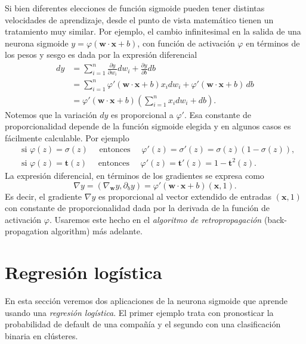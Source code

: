\documentclass[12pt, a4paper]{amsbook}
\newcommand{\tb}{{\mathbf t}}
\newcommand{\ww}{{\mathbf w}}
\newcommand{\xx}{{\mathbf x}}
\theoremstyle{remark}
\theoremstyle{definition}
\numberwithin{section}{chapter}
\numberwithin{subsection}{section}
\numberwithin{equation}{section}
\numberwithin{figure}{chapter}
\begin{document}
Si bien diferentes elecciones de función sigmoide pueden tener distintas velocidades de aprendizaje, desde el punto de vista matemático tienen un tratamiento muy similar. Por ejemplo, el cambio infinitesimal en la salida de una neurona sigmoide $y=\varphi(\ww\cdot\xx + b)$, con función de activación $\varphi$ en términos de los pesos y sesgo es dada por la expresión diferencial
\begin{align*}
dy &= \sum_{i=1}^n \frac{\partial y}{\partial w_i} dw_i + \frac{\partial y}{\partial b} db\\
&= \sum_{i=1}^n \varphi'(\ww\cdot\xx+ b) x_i dw_i + \varphi'(\ww\cdot\xx+ b) \, db\\
&=\varphi'(\ww\cdot\xx+ b)\left(\sum_{i=1}^n x_i dw_i + db\right).
\end{align*}
Notemos que la variación $dy$ es proporcional a $\varphi'$. Esa constante de proporcionalidad depende de la función sigmoide elegida y en algunos casos es fácilmente calculable. Por ejemplo
\begin{align*}
&\text{si }\varphi(z) = \sigma(z) \quad \text{ entonces } \quad \varphi'(z) = \sigma'(z) = \sigma(z)(1-\sigma(z)),\\
&\text{si }\varphi(z) = \tb(z) \quad \text{ entonces } \quad \varphi'(z) = \tb'(z) = 1-\tb^2(z).
\end{align*}
La expresión diferencial, en términos de los gradientes se expresa como
$$
\nabla y = (\nabla_\ww y, \partial_b y) = \varphi'(\ww\cdot\xx + b) (\xx, 1).
$$
Es decir, el gradiente $\nabla y$ es proporcional al vector extendido de entradas $(\xx, 1)$ con constante de proporcionalidad dada por la derivada de la función de activación $\varphi$. Usaremos este hecho en el {\em algoritmo de retropropagación} (back-propagation algorithm) más adelante.

\section{Regresión logística}\label{sec.c5.4}

En esta sección veremos dos aplicaciones de la neurona sigmoide que aprende usando una {\em regresión logística}. El primer ejemplo trata con pronosticar la probabilidad de default de una compañía y el segundo con una clasificación binaria en clústeres. 
\end{document}
